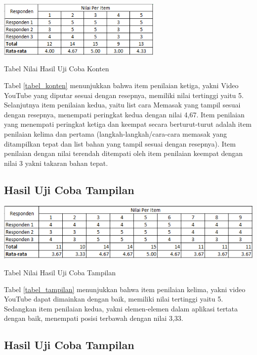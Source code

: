 			\begin{table}[H]
				\centering
				\includegraphics[width=0.6\textwidth]{gambar/new/konten_tabel}
				\caption{Tabel Nilai Hasil Uji Coba Konten}
				\label{tabel_konten}
			\end{table}
			Tabel \ref{tabel_konten} menunjukkan bahwa item penilaian ketiga, yakni Video YouTube yang diputar sesuai dengan resepnya, memiliki nilai tertinggi yaitu 5. Selanjutnya item penilaian kedua, yaitu list cara Memasak yang tampil sesuai dengan resepnya, menempati peringkat kedua dengan nilai 4,67. Item penilaian yang menempati peringkat ketiga dan keempat secara berturut-turut adalah item penilaian kelima dan pertama (langkah-langkah/cara-cara memasak yang ditampilkan tepat dan list bahan yang tampil sesuai dengan resepnya). Item penilaian dengan nilai terendah ditempati oleh item penilaian keempat dengan nilai 3 yakni takaran bahan tepat.  

		\subsection{Hasil Uji Coba Tampilan}

			\begin{table}[H]
				\centering
				\includegraphics[width=1\textwidth]{gambar/new/tampilan_tabel}
				\caption{Tabel Nilai Hasil Uji Coba Tampilan}
				\label{tabel_tampilan}
			\end{table}
			Tabel \ref{tabel_tampilan} menunjukkan bahwa item penilaian kelima, yakni video YouTube dapat dimainkan dengan baik, memiliki nilai tertinggi yaitu 5. Sedangkan item penilaian kedua, yakni elemen-elemen dalam aplikasi tertata dengan baik, menempati posisi terbawah dengan nilai 3,33.
	
		\subsection{Hasil Uji Coba Tampilan}

